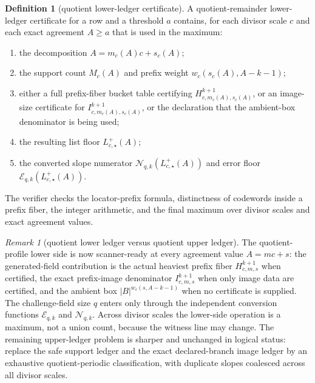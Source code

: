 \documentclass[11pt]{article}
\theoremstyle{definition}
\newtheorem{definition}[definition]{Definition}
\theoremstyle{remark}
\newtheorem{remark}[remark]{Remark}
\newcommand{\B}{B}
\begin{document}
\begin{definition}[quotient lower-ledger certificate]
\label{def:quotient-lower-ledger-certificate}
A quotient-remainder lower-ledger certificate for a row and a threshold $a$
contains, for each divisor scale $c$ and each exact agreement $A\ge a$ that is
used in the maximum:
\begin{enumerate}[label=\textup{(\roman*)},leftmargin=2.2em]
\item the decomposition $A=m_c(A)c+s_c(A)$;
\item the support count $M_c(A)$ and prefix weight $w_c(s_c(A),A-k-1)$;
\item either a full prefix-fiber bucket table certifying
$H_{c,m_c(A),s_c(A)}^{k+1}$, or an image-size certificate for
$I_{c,m_c(A),s_c(A)}^{k+1}$, or the declaration that the ambient-box denominator
is being used;
\item the resulting list floor $L_{c,\star}^+(A)$;
\item the converted slope numerator
$\mathcal N_{q,k}(L_{c,\star}^+(A))$ and error floor
$\mathcal E_{q,k}(L_{c,\star}^+(A))$.
\end{enumerate}
The verifier checks the locator-prefix formula, distinctness of codewords inside
a prefix fiber, the integer arithmetic, and the final maximum over divisor
scales and exact agreement values.
\end{definition}

\begin{remark}[quotient lower ledger versus quotient upper ledger]
\label{rem:T1-lower-ledger-status}
The quotient-profile lower side is now scanner-ready at every agreement value
$A=mc+s$: the generated-field contribution is the actual heaviest prefix fiber
$H_{c,m,s}^{k+1}$ when certified, the exact prefix-image denominator
$I_{c,m,s}^{k+1}$ when only image data are certified, and the ambient box
$|\B|^{w_c(s,A-k-1)}$ when no certificate is supplied.  The challenge-field size
$q$ enters only through the independent conversion functions
$\mathcal E_{q,k}$ and $\mathcal N_{q,k}$.  Across divisor scales the lower-side
operation is a maximum, not a union count, because the witness line may change.
The remaining upper-ledger problem is sharper and unchanged in logical status:
replace the safe support ledger and the exact declared-branch image ledger by an
exhaustive quotient-periodic classification, with duplicate slopes coalesced
across all divisor scales.
\end{remark}
\end{document}
